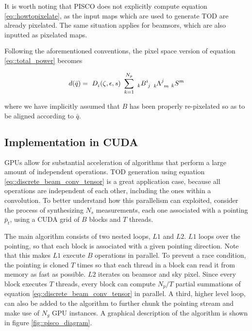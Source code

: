\documentclass[a4paper,11pt]{article}
\begin{document}
\noindent
It is worth noting that PISCO does not explicitly compute equation \ref{eq::howtopixelate}, as the input maps which are used to generate TOD are already pixelated. The same situation applies for beamsors, which are also inputted as pixelated maps.

Following the aforementioned conventions, the pixel space version of equation \ref{eq::total_power} becomes

\begin{equation}
\begin{aligned}
d(\bar{q}) = \
\tensor{D}{_{i}}(\zeta,\epsilon,s) \
\sum_{k=1}^{N_p} \
\tensor[_k]{B}{^i_j} \
\tensor[_k]{\Lambda}{^j_m} \
\tensor[_k]{S}{^m}
\end{aligned}
\label{eq::discrete_beam_conv_tensor}
\end{equation}

\noindent
where we have implicitly assumed that $B$ has been properly re-pixelated so as to be aligned according to $\bar{q}$. 

\subsection{Implementation in CUDA}

GPUs allow for substantial acceleration of algorithms that perform a large amount of independent operations\cite{sanders2010cuda}. TOD generation using equation \ref{eq::discrete_beam_conv_tensor} is a great application case, because all operations are independent of each other, including the ones within a convolution. To better understand how this parallelism can exploited, consider the process of synthesizing $N_s$ measurements, each one associated with a pointing $\bar{p}_t$, using a CUDA grid of $B$ blocks and $T$ threads.

The main algorithm consists of two nested loops, $L1$ and $L2$. $L1$ loops over the pointing, so that each block is associated with a given pointing direction. Note that this makes $L1$ execute $B$ operations in parallel. To prevent a race condition, the pointing is cloned $T$ times so that each thread in a block can read it from memory as fast as possible. $L2$ iterates on beamsor and sky pixel. Since every block executes $T$ threads, every block can compute $N_p/T$ partial summations of equation \ref{eq::discrete_beam_conv_tensor} in parallel. A third, higher level loop, can also be added to the algorithm to further chunk the pointing stream and make use of $N_g$ GPU instances. A graphical description of the algorithm is shown in figure \ref{fig::pisco_diagram}.
\end{document}
